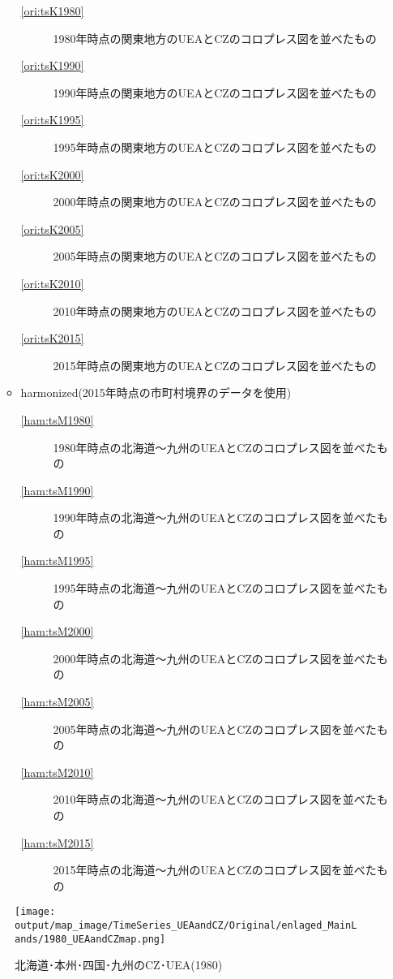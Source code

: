 \documentclass{ltjsarticle}
\begin{document}
\begin{itemize}
\begin{itemize}
\begin{description}
      \item[\ref{ori:tsK1980}] 1980年時点の関東地方のUEAとCZのコロプレス図を並べたもの
      \item[\ref{ori:tsK1990}] 1990年時点の関東地方のUEAとCZのコロプレス図を並べたもの
      \item[\ref{ori:tsK1995}] 1995年時点の関東地方のUEAとCZのコロプレス図を並べたもの
      \item[\ref{ori:tsK2000}] 2000年時点の関東地方のUEAとCZのコロプレス図を並べたもの
      \item[\ref{ori:tsK2005}] 2005年時点の関東地方のUEAとCZのコロプレス図を並べたもの
      \item[\ref{ori:tsK2010}] 2010年時点の関東地方のUEAとCZのコロプレス図を並べたもの
      \item[\ref{ori:tsK2015}] 2015年時点の関東地方のUEAとCZのコロプレス図を並べたもの
    \end{description}

    \item harmonized(2015年時点の市町村境界のデータを使用)
    \begin{description}
      \item[\ref{ham:tsM1980}] 1980年時点の北海道～九州のUEAとCZのコロプレス図を並べたもの
      \item[\ref{ham:tsM1990}] 1990年時点の北海道～九州のUEAとCZのコロプレス図を並べたもの
      \item[\ref{ham:tsM1995}] 1995年時点の北海道～九州のUEAとCZのコロプレス図を並べたもの
      \item[\ref{ham:tsM2000}] 2000年時点の北海道～九州のUEAとCZのコロプレス図を並べたもの
      \item[\ref{ham:tsM2005}] 2005年時点の北海道～九州のUEAとCZのコロプレス図を並べたもの
      \item[\ref{ham:tsM2010}] 2010年時点の北海道～九州のUEAとCZのコロプレス図を並べたもの
      \item[\ref{ham:tsM2015}] 2015年時点の北海道～九州のUEAとCZのコロプレス図を並べたもの
    \end{description}
  \end{itemize}
\end{itemize}

\begin{figure}[pbth]
  \centering
  \texttt{[image: output/map\_image/TimeSeries\_UEAandCZ/Original/enlaged\_MainLands/1980\_UEAandCZmap.png]}
  \caption{\label{ori:tsM1980}北海道･本州･四国･九州のCZ･UEA(1980)}
\end{figure}
\end{document}
